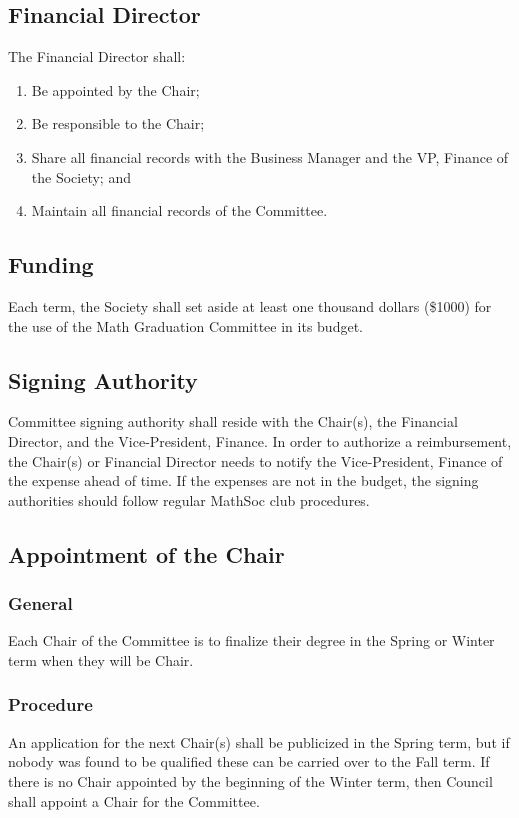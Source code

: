 \subsection{Financial Director}
The Financial Director shall:
\begin{enumerate}
\item Be appointed by the Chair;
\item Be responsible to the Chair;
\item Share all financial records with the Business Manager and the VP, Finance of 
the Society; and
\item Maintain all financial records of the Committee.
\end{enumerate}

\subsection{Funding}
Each term, the Society shall set aside at least one thousand dollars (\$1000) for the use of the Math Graduation Committee in its budget.

\subsection{Signing Authority}
Committee signing authority shall reside with the Chair(s), the Financial Director, 
and the Vice-President, Finance. In order to authorize a reimbursement, the Chair(s) 
or Financial Director needs to notify the Vice-President, Finance of the expense 
ahead of time. If the expenses are not in the budget, the signing authorities should 
follow regular MathSoc club procedures. 

\subsection{Appointment of the Chair}
\subsubsection{General}
Each Chair of the Committee is to finalize their degree in the Spring or Winter term 
when they will be Chair.

\subsubsection{Procedure}
An application for the next Chair(s) shall be publicized in the Spring term, but if 
nobody was found to be qualified these can be carried over to the Fall term. If there 
is no Chair appointed by the beginning of the Winter term, then Council shall appoint 
a Chair for the Committee.

